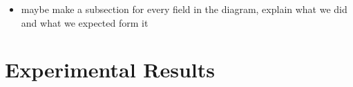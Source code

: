 \documentclass[letterpaper]{article}
\begin{document}
%
%
%
%

\begin{itemize}
\item maybe make a subsection for every field in the diagram, explain what we did and what we expected form it
\end{itemize}

\section{Experimental Results}\label{sec:exp}
\end{document}
